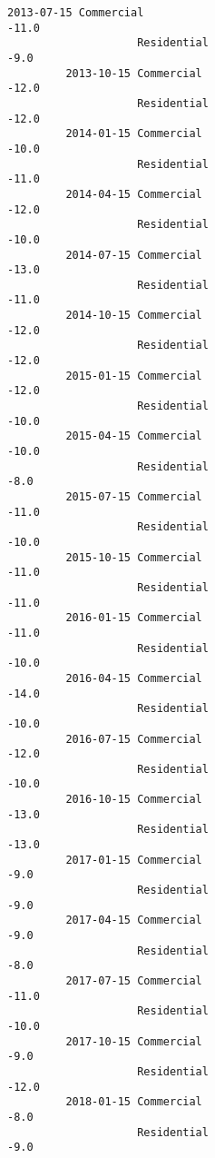 \documentclass[11pt]{article}
\begin{document}
\begin{Verbatim}[commandchars=\\\{\}]
         2013-07-15 Commercial                                             -11.0   
                    Residential                                             -9.0   
         2013-10-15 Commercial                                             -12.0   
                    Residential                                            -12.0   
         2014-01-15 Commercial                                             -10.0   
                    Residential                                            -11.0   
         2014-04-15 Commercial                                             -12.0   
                    Residential                                            -10.0   
         2014-07-15 Commercial                                             -13.0   
                    Residential                                            -11.0   
         2014-10-15 Commercial                                             -12.0   
                    Residential                                            -12.0   
         2015-01-15 Commercial                                             -12.0   
                    Residential                                            -10.0   
         2015-04-15 Commercial                                             -10.0   
                    Residential                                             -8.0   
         2015-07-15 Commercial                                             -11.0   
                    Residential                                            -10.0   
         2015-10-15 Commercial                                             -11.0   
                    Residential                                            -11.0   
         2016-01-15 Commercial                                             -11.0   
                    Residential                                            -10.0   
         2016-04-15 Commercial                                             -14.0   
                    Residential                                            -10.0   
         2016-07-15 Commercial                                             -12.0   
                    Residential                                            -10.0   
         2016-10-15 Commercial                                             -13.0   
                    Residential                                            -13.0   
         2017-01-15 Commercial                                              -9.0   
                    Residential                                             -9.0   
         2017-04-15 Commercial                                              -9.0   
                    Residential                                             -8.0   
         2017-07-15 Commercial                                             -11.0   
                    Residential                                            -10.0   
         2017-10-15 Commercial                                              -9.0   
                    Residential                                            -12.0   
         2018-01-15 Commercial                                              -8.0   
                    Residential                                             -9.0   
         

\end{Verbatim}
\end{document}
